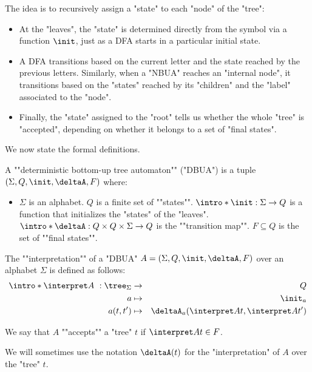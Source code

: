 \documentclass[a4paper,UKenglish,cleveref, autoref, thm-restate]{lipics-v2021}
\begin{document}
The idea is to recursively assign a "state" to each "node" of the "tree":
\begin{itemize}
	\item At the "leaves", the "state" is determined directly from the symbol via a function $\init$, just as a DFA starts in a particular initial state.
	\item A DFA transitions based on the current letter and the state reached by the previous letters.
	      Similarly, when a "NBUA" reaches an "internal node", it transitions based on the "states" reached by its "children" and the "label" associated to the "node".
	\item Finally, the "state" assigned to the "root" tells us whether the whole "tree" is "accepted",
	      depending on whether it belongs to a set of "final states".
\end{itemize}

We now state the formal definitions.

\begin{definition}
	\AP A ""deterministic bottom-up tree automaton"" (\reintro*"DBUA") is a tuple $(\Sigma, Q, \init, \deltaA, F)$ where:
	\begin{itemize}
		\item $\Sigma$ is an alphabet.
		      \itemAP $Q$ is a finite set of ""states"".
		      \itemAP $\intro*\init : \Sigma \to Q$ is a function that initializes the "states" of the "leaves".
		      \itemAP $\intro*\deltaA : Q \times Q \times \Sigma \to Q$ is the ""transition map"".
		      \itemAP $F \subseteq Q$ is the set of ""final states"".
	\end{itemize}
\end{definition}

\begin{definition}
	\AP The ""interpretation"" of a "DBUA" $A = (\Sigma, Q, \init, \deltaA, F)$  over an alphabet $\Sigma$ is defined as follows:
	\begin{eqnarray*}
		\intro* \interpret A ~: \tree_{\Sigma} &\to& Q \\
		a &\mapsto& \init_a \\
		a(t,t') &\mapsto& \deltaA_a (\interpret A t, \interpret A {t'})
	\end{eqnarray*}

	We say that $A$ ""accepts"" a "tree" $t$ if $\interpret A t \in F$.

	We will sometimes use the notation $\deltaA(t)$ for the "interpretation" of $A$ over the "tree" $t$.
\end{definition}
\end{document}
